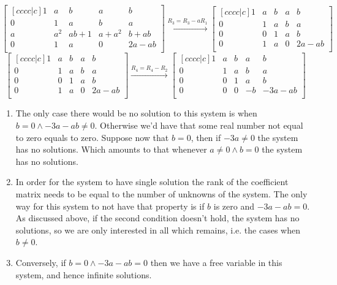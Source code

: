 \documentclass[11pt]{article}
\begin{document}
\begin{equation*}
  \begin{bmatrix}[cccc|c]
    1 & a   & b    & a     & b \\
    0 & 1   & a    & b     & a \\
    a & a^2 & ab+1 & a+a^2 & b+ab \\
    0 & 1   & a    & 0     & 2a-ab \\
  \end{bmatrix}
  \xrightarrow{R_3 = R_3 - aR_1}
  \begin{bmatrix}[cccc|c]
    1 & a & b & a & b \\
    0 & 1 & a & b & a \\
    0 & 0 & 1 & a & b \\
    0 & 1 & a & 0 & 2a-ab \\
  \end{bmatrix}
\end{equation*}
\begin{equation*}
  \begin{bmatrix}[cccc|c]
    1 & a & b & a & b \\
    0 & 1 & a & b & a \\
    0 & 0 & 1 & a & b \\
    0 & 1 & a & 0 & 2a-ab \\
  \end{bmatrix}
  \xrightarrow{R_4 = R_4 - R_2}
  \begin{bmatrix}[cccc|c]
    1 & a & b & a & b \\
    0 & 1 & a & b & a \\
    0 & 0 & 1 & a & b \\
    0 & 0 & 0 & -b & -3a-ab \\
  \end{bmatrix}
\end{equation*}

\begin{enumerate}
\item The only case there would be no solution to this system is when
$b=0\land -3a-ab\neq0$.  Otherwise we'd have that some real number not
equal to zero equals to zero.  Suppose now that $b=0$, then if $-3a\neq0$
the system has no solutions.  Which amounts to that whenever
$a\neq0\land b=0$ the system has no solutions.
\item In order for the system to have single solution the rank of the
coefficient matrix needs to be equal to the number of unknowns of the
system.  The only way for this system to not have that property is if $b$
is zero and $-3a-ab=0$. As discussed above, if the second condition doesn't
hold, the system has no solutions, so we are only interested in all which
remains, i.e. the cases when $b\neq0$.
\item Conversely, if $b=0\land-3a-ab=0$ then we have a free variable in this 
system, and hence infinite solutions.
\end{enumerate}
\end{document}
